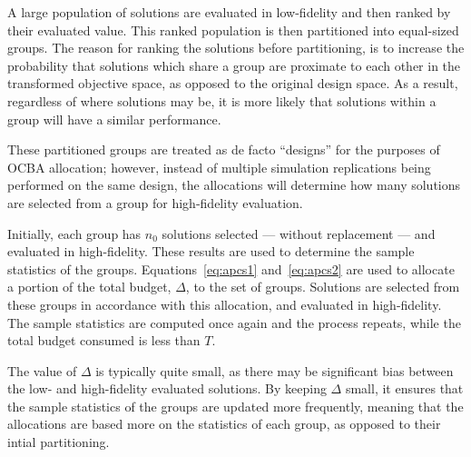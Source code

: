 A large population of solutions are evaluated in low-fidelity and then ranked by their evaluated value. This ranked population is then partitioned into equal-sized groups. The reason for ranking the solutions before partitioning, is to increase the probability that solutions which share a group are proximate to each other in the transformed objective space, as opposed to the original design space. As a result, regardless of where solutions may be, it is more likely that solutions within a group will have a similar performance.

These partitioned groups are treated as de facto ``designs'' for the purposes of OCBA allocation; however, instead of multiple simulation replications being performed on the same design, the allocations will determine how many solutions are selected from a group for high-fidelity evaluation.

Initially, each group has $n_0$ solutions selected --- without replacement --- and evaluated in high-fidelity. These results are used to determine the sample statistics of the groups. Equations~\ref{eq:apcs1} and~\ref{eq:apcs2} are used to allocate a portion of the total budget, $\Delta$, to the set of groups. Solutions are selected from these groups in accordance with this allocation, and evaluated in high-fidelity. The sample statistics are computed once again and the process repeats, while the total budget consumed is less than $T$.

The value of $\Delta$ is typically quite small, as there may be significant bias between the low- and high-fidelity evaluated solutions. By keeping $\Delta$ small, it ensures that the sample statistics of the groups are updated more frequently, meaning that the allocations are based more on the statistics of each group, as opposed to their intial partitioning.

